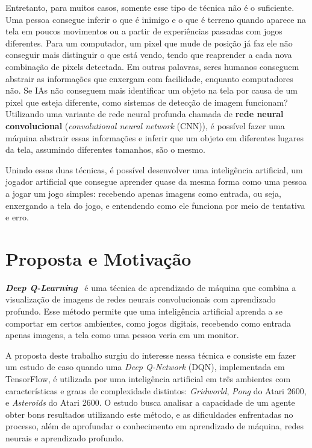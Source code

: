 Entretanto, para muitos casos, somente esse tipo de técnica não é o suficiente.
Uma pessoa consegue inferir o que é inimigo e o que é terreno quando aparece na tela em poucos movimentos ou a partir de experiências passadas com jogos diferentes.
Para um computador, um pixel que mude de posição já faz ele não conseguir mais distinguir o que está vendo, tendo que reaprender a cada nova combinação de pixels detectada.
Em outras palavras, seres humanos conseguem abstrair as informações que enxergam com facilidade, enquanto computadores não.
Se IAs não conseguem mais identificar um objeto na tela por causa de um pixel que esteja diferente, como sistemas de detecção de imagem funcionam?
Utilizando uma variante de rede neural profunda chamada de \textbf{rede neural convolucional} (\textit{convolutional neural network} (CNN)), é possível fazer uma máquina abstrair essas informações e inferir que um objeto em diferentes lugares da tela, assumindo diferentes tamanhos, são o mesmo.

Unindo essas duas técnicas, é possível desenvolver uma inteligência artificial, um jogador artificial que consegue aprender quase da mesma forma como uma pessoa a jogar um jogo simples: recebendo apenas imagens como entrada, ou seja, enxergando a tela do jogo, e entendendo como ele funciona por meio de tentativa e erro. 

\section{Proposta e Motivação}
\label{sec:motivacao_proposta}

\textbf{\textit{Deep Q-Learning}}~\cite{DBLP:journals/corr/MnihKSGAWR13} é uma técnica de aprendizado de máquina que combina a visualização de imagens de redes neurais convolucionais com  aprendizado profundo.
Esse método permite que uma inteligência artificial aprenda a se comportar em certos ambientes, como jogos digitais, recebendo como entrada apenas imagens, a tela como uma pessoa veria em um monitor.

A proposta deste trabalho surgiu do interesse nessa técnica e consiste em fazer um estudo de caso quando uma \textit{Deep Q-Network} (DQN), implementada em TensorFlow, é utilizada por uma inteligência artificial em três ambientes com características e graus de complexidade distintos: \textit{Gridworld}, \textit{Pong} do Atari 2600, e \textit{Asteroids} do Atari 2600.
O estudo busca analisar a capacidade de um agente obter bons resultados utilizando este método, e as dificuldades enfrentadas no processo, além de aprofundar o conhecimento em aprendizado de máquina, redes neurais e aprendizado profundo.

